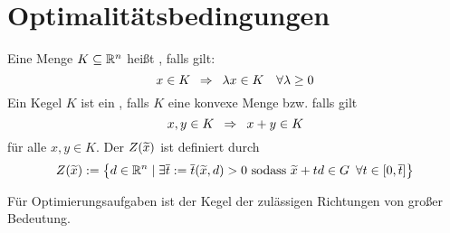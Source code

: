 \section{Optimalitätsbedingungen}

\begin{definition} %
	\label{definition: 2.3_kegel}
	Eine Menge $K \subseteq \mathbb{R}^n$ heißt , falls gilt:
	\begin{equation*}
	x \in K \enskip \Rightarrow \enskip \lambda x \in K \quad \forall \lambda \ge 0
	\end{equation*}
	Ein Kegel $K$ ist ein , falls $K$ eine konvexe Menge bzw. falls gilt
	\begin{equation*}
	x,y \in K \enskip \Rightarrow \enskip x+y \in K
	\end{equation*}
	für alle $x,y \in K$. Der  $Z(\widetilde{x})$ ist definiert durch
	\begin{equation*}
	Z(\widetilde{x}) \mathrel{:=} \left\{ d \in \mathbb{R}^n \mid \exists \overline{t} \mathrel{:=} \overline{t}(\widetilde{x},d) > 0 \text{ sodass } \widetilde{x} + td \in G \enskip \forall t \in [0,\overline{t}] \right\}
	\end{equation*}
\end{definition}



Für Optimierungsaufgaben ist der Kegel der zulässigen Richtungen von großer Bedeutung.

